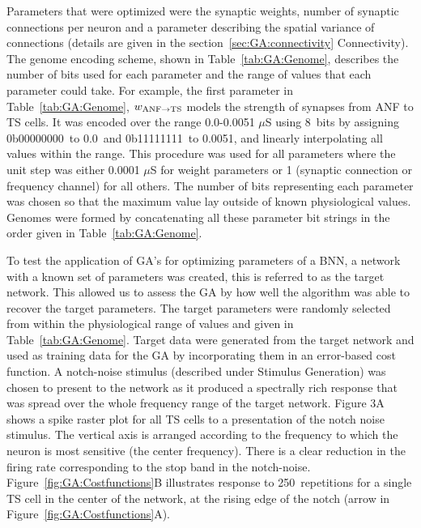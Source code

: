 \smallskip{} 

Parameters that were optimized were the synaptic weights, number of
synaptic connections per neuron and a parameter describing the spatial
variance of connections (details are given in the
section~\ref{sec:GA:connectivity} Connectivity). The genome encoding
scheme, shown in Table~\ref{tab:GA:Genome}, describes the number of bits
used for each parameter and the range of values that each parameter
could take.  For example, the first parameter in Table~\ref{tab:GA:Genome},
$w_{{\rm ANF}\to{\rm TS}}$ models the strength of synapses from ANF to
TS cells. It was encoded over the range 0.0-0.0051 $\mu$S using 8~bits
by assigning 0b00000000~to 0.0~and 0b11111111~to 0.0051, and linearly
interpolating all values within the range. This procedure was used for
all parameters where the unit step was either 0.0001 $\mu$S for weight
parameters or 1 (synaptic connection or frequency channel) for all
others. The number of bits representing each parameter was chosen so
that the maximum value lay outside of known physiological
values. Genomes were formed by concatenating all these parameter bit
strings in the order given in Table~\ref{tab:GA:Genome}.

\smallskip{}

To test the application of GA's for optimizing parameters of a BNN, a
network with a known set of parameters was created, this is referred
to as the target network.  This allowed us to assess the GA by how
well the algorithm was able to recover the target parameters. The
target parameters were randomly selected from within the physiological
range of values and given in Table~\ref{tab:GA:Genome}.  Target data were
generated from the target network and used as training data for the GA
by incorporating them in an error-based cost function.  A notch-noise
stimulus (described under Stimulus Generation) was chosen to present
to the network as it produced a spectrally rich response that was
spread over the whole frequency range of the target network.  Figure
3A shows a spike raster plot for all TS cells to a presentation of the
notch noise stimulus. The vertical axis is arranged according to the
frequency to which the neuron is most sensitive (the center
frequency). There is a clear reduction in the firing rate
corresponding to the stop band in the
notch-noise. Figure~\ref{fig:GA:Costfunctions}B illustrates response
to 250~repetitions for a single TS cell in the center of the network,
at the rising edge of the notch (arrow in
Figure~\ref{fig:GA:Costfunctions}A).

